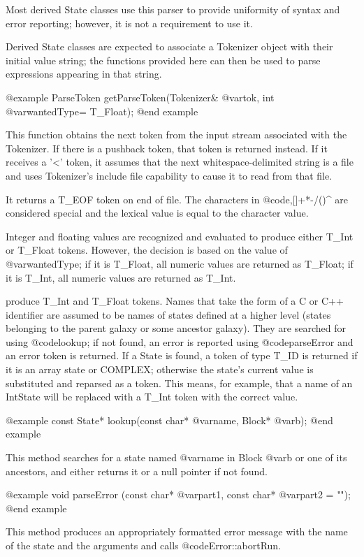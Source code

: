 Most derived State classes use this parser to provide uniformity
of syntax and error reporting; however, it is not a requirement to
use it.

Derived State classes are expected to associate a Tokenizer object
with their initial value string; the functions provided here can
then be used to parse expressions appearing in that string.

@example
ParseToken getParseToken(Tokenizer& @var{tok}, int @var{wantedType}= T_Float);
@end example

This function obtains the next token from the input stream associated
with the Tokenizer.  If there is a pushback token, that token is
returned instead.  If it receives a '<' token, it assumes that the
next whitespace-delimited string is a file and uses Tokenizer's include
file capability to cause it to read from that file.

It returns a T_EOF token on end of file.  The characters in @code{,[]+*-/()^}
are considered special and the lexical value is equal to the character
value.

Integer and floating values are recognized and evaluated to produce
either T_Int or T_Float tokens.  However, the decision is based on
the value of @var{wantedType}; if it is T_Float, all numeric values
are returned as T_Float; if it is T_Int, all numeric values are returned
as T_Int.

produce T_Int and T_Float tokens.  Names that take the form of a
C or C++ identifier are assumed to be names of states defined at a
higher level (states belonging to the parent galaxy or some ancestor
galaxy).  They are searched for using @code{lookup}; if not found,
an error is reported using @code{parseError} and an error token is
returned.  If a State is found, a token of type T_ID is returned if
it is an array state or COMPLEX; otherwise the state's current value
is substituted and reparsed as a token.  This means, for example, that
a name of an IntState will be replaced with a T_Int token with the
correct value.

@example
const State* lookup(const char* @var{name}, Block* @var{b});
@end example

This method searches for a state named @var{name} in Block @var{b} or
one of its ancestors, and either returns it or a null pointer if
not found.

@example
void parseError (const char* @var{part1}, const char* @var{part2} = "");
@end example

This method produces an appropriately formatted error message with
the name of the state and the arguments and calls @code{Error::abortRun}.

